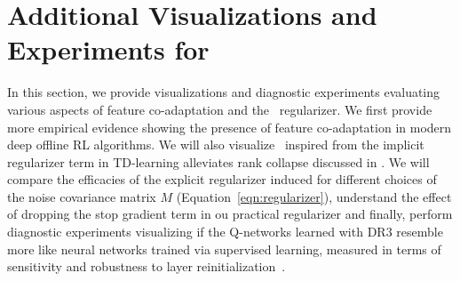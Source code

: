 \section{Additional Visualizations and Experiments for \methodname}

In this section, we provide visualizations and diagnostic experiments evaluating various  aspects of feature co-adaptation and the \methodname\ regularizer. We first provide more empirical evidence showing the presence of feature co-adaptation in modern deep offline RL algorithms. We will also visualize \methodname\, inspired from the implicit regularizer term in TD-learning alleviates rank collapse discussed in \citet{kumar2021implicit}. We will compare the efficacies of the explicit regularizer induced for different choices of the noise covariance matrix $M$ (Equation~\ref{eqn:regularizer}), understand the effect of dropping the stop gradient term in ou practical regularizer and finally, perform diagnostic experiments visualizing if the Q-networks learned with DR3 resemble more like neural networks trained via supervised learning, measured in terms of sensitivity and robustness to layer reinitialization~\citep{zhang2019all}.

\vspace{-0.05in}

